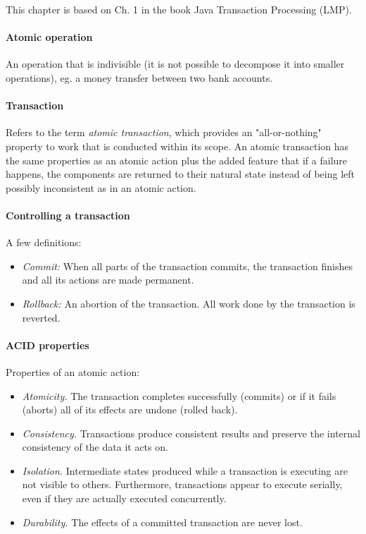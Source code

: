 
This chapter is based on Ch. 1 in the book Java Transaction Processing (LMP).

\sepline

\paragraph{Atomic operation} An operation that is indivisible (it is not possible to decompose it into smaller operations), eg. a money transfer between two bank accounts.

\paragraph{Transaction} Refers to the term \textit{atomic transaction}, which provides an "all-or-nothing" property to work that is conducted within its scope. An atomic transaction has the same properties as an atomic action plus the added feature that if a failure happens, the components are returned to their natural state instead of being left possibly inconsistent as in an atomic action.

\paragraph{Controlling a transaction} A few definitions:
\begin{itemize}
  \item \textit{Commit:} When all parts of the transaction commits, the transaction finishes and all its actions are made permanent.
  \item \textit{Rollback:} An abortion of the transaction. All work done by the transaction is reverted.
\end{itemize}

\paragraph{ACID properties} Properties of an atomic action:
\begin{itemize}[nolistsep,noitemsep]
  \item \textit{Atomicity.} The transaction completes successfully (commits) or if it fails (aborts) all of its effects are undone (rolled back).
  \item \textit{Consistency.} Transactions produce consistent results and preserve the internal consistency of the data it acts on.
  \item \textit{Isolation.} Intermediate states produced while a transaction is executing are not visible to others. Furthermore, transactions appear to execute serially, even if they are actually executed concurrently.
  \item \textit{Durability.} The effects of a committed transaction are never lost.
\end{itemize}

